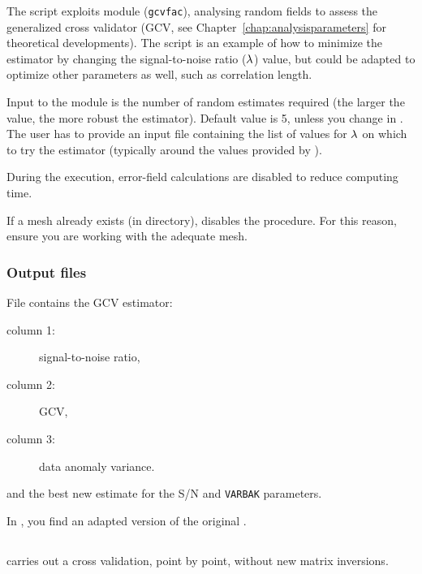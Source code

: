 The script  exploits \diva module (\texttt{gcvfac}), analysing random fields to assess the generalized cross validator (GCV, see Chapter~\ref{chap:analysisparameters} for theoretical developments). The script  is an example of how to minimize the estimator by changing the signal-to-noise ratio ($\lambda$) value, but could be adapted to optimize other parameters as well, such as correlation length.

Input to the module is the number of random estimates required (the larger the value, the more robust the estimator). Default value is 5, unless you change in . The user has to provide an input file  containing the list of values for $\lambda$ on which to try the estimator (typically around the values provided by ).

During the  execution, error-field calculations are disabled to reduce computing time. 

\btips
If a mesh already exists (in  directory),  disables the  procedure. For this reason, ensure you are working with the adequate mesh.
\etips

\subsubsection{Output files}

File  contains the GCV estimator:
\begin{description}
\item[column 1:] signal-to-noise ratio, 
\item[column 2:] GCV,
\item[column 3:] data anomaly variance.
\end{description}  
and  the best new estimate for the S/N and \texttt{VARBAK} parameters.

In , you find an adapted version of the original .



\subsection{}

 carries out a cross validation, point by point, without new matrix inversions. 

